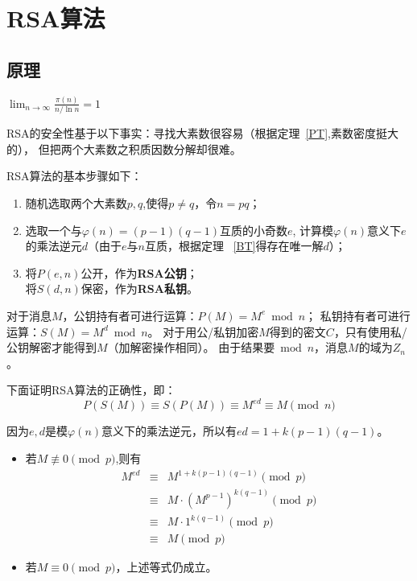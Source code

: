 \section{RSA算法}
\subsection{原理}
\begin{theorem}[素数定理]\label{PT}
	$\displaystyle \lim_{n\rightarrow\infty}\frac{\pi(n)}{n/\ln n}=1$
\end{theorem}
RSA的安全性基于以下事实：寻找大素数很容易（根据定理~\ref{PT},素数密度挺大的），
但把两个大素数之积质因数分解却很难。

RSA算法的基本步骤如下：
\begin{enumerate}
	\item 随机选取两个大素数$p,q$,使得$p\neq q$，令$n=pq$；
	\item 选取一个与$\varphi(n)=(p-1)(q-1)$互质的小奇数$e$,
	      计算模$\varphi(n)$意义下$e$的乘法逆元$d$（由于$e$与$n$互质，根据定理
	      ~\ref{BT}得存在唯一解$d$）；
	\item 将$P(e,n)$公开，作为{\bfseries RSA公钥}；\\
	      将$S(d,n)$保密，作为{\bfseries RSA私钥}。
\end{enumerate}

对于消息$M$，公钥持有者可进行运算：$P(M)=M^e \bmod n$；
私钥持有者可进行运算：$S(M)=M^d \bmod n$。
对于用公/私钥加密$M$得到的密文$C$，只有使用私/公钥解密才能得到$M$（加解密操作相同）。
由于结果要$\bmod n$，消息$M$的域为$Z_n$。

下面证明RSA算法的正确性，即：
\begin{displaymath}
	P(S(M))\equiv S(P(M))\equiv M^{ed}\equiv M \pmod{n}
\end{displaymath}

因为$e,d$是模$\varphi(n)$意义下的乘法逆元，所以有$ed=1+k(p-1)(q-1)$。

\begin{itemize}
	\item 若$M\not\equiv 0 \pmod{p}$,则有
	      \begin{eqnarray*}
		      M^{ed}&\equiv& M^{1+k(p-1)(q-1)} \pmod{p}\\
		      &\equiv& M\cdot (M^{p-1})^{k(q-1)} \pmod{p}\\
		      &\equiv& M\cdot 1^{k(q-1)} \pmod{p}\\
		      &\equiv& M \pmod{p}
	      \end{eqnarray*}
	\item 若$M\equiv 0 \pmod{p}$，上述等式仍成立。
\end{itemize}

